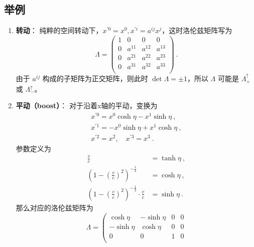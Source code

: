 \subsection{举例}
\begin{enumerate}
\item \textbf{转动}： 纯粹的空间转动下，$x^{\prime 0}=x^{0}, x^{\prime i}=a^{i j} x^{j}$，这时洛伦兹矩阵写为
\begin{equation}       %
\Lambda=\left(                 %
  \begin{array}{cccc}   %
   1& 0 & 0 & 0\\  %
   0& a^{11} &  a^{12} &  a^{13}\\  %
   0& a^{21} &  a^{22} &  a^{23}\\  %
   0& a^{31} &  a^{32} &  a^{33}\\  %
  \end{array}
\right)  ~.               %
\end{equation}
由于 $a^{ij}$ 构成的子矩阵为正交矩阵，则此时 $\det\Lambda=\pm1$，所以 $\Lambda$ 可能是 $\Lambda_{+}^{\uparrow}$ 或 $\Lambda_{-}^{\uparrow}$。
\item \textbf{平动（boost）}： 对于沿着x轴的平动，变换为
\begin{equation}\begin{array}{c}
x^{\prime 0}=x^{0} \cosh \eta-x^{1} \sinh \eta~, \\
x^{\prime 1}=-x^{0} \sinh \eta+x^{1} \cosh \eta ~,\\
x^{\prime 2}=x^{2}, \quad x^{\prime 3}=x^{3}~.
\end{array}\end{equation}
参数定义为
\begin{equation}
\begin{aligned}
 \frac{v}{c} &=\tanh\eta ~,\\
\left(1-(\frac{v}{c})^2 \right)^{-\frac{1}{2}} &=\cosh\eta~,\\
\left   (1-(\frac{v}{c})^2 \right)^{-\frac{1}{2}}\cdot\frac{v}{c}&=\sinh\eta~. 
\end{aligned}
\end{equation}
那么对应的洛伦兹矩阵为
\begin{equation}\Lambda=\left(\begin{array}{cccc}
\cosh \eta & -\sinh \eta & 0 & 0 \\
-\sinh \eta & \cosh \eta & 0 & 0 \\
0 & 0 & 1 & 0 \\

\end{array}
\end{equation}
\end{enumerate}
